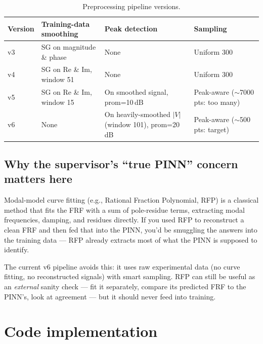 \documentclass[11pt,a4paper]{article}
\begin{document}
\begin{table}[h]
\centering
\small
\begin{tabularx}{\linewidth}{l X X X}
\toprule
\textbf{Version} & \textbf{Training-data smoothing} & \textbf{Peak detection} & \textbf{Sampling} \\
\midrule
v3 & SG on magnitude \& phase   & None & Uniform 300 \\
v4 & SG on Re \& Im, window 51  & None & Uniform 300 \\
v5 & SG on Re \& Im, window 15  & On smoothed signal, prom=10\,dB & Peak-aware ($\sim$7000 pts: too many) \\
v6 & None                        & On heavily-smoothed $|V|$ (window 101), prom=20\,dB & Peak-aware ($\sim$500 pts: target) \\
\bottomrule
\end{tabularx}
\caption{Preprocessing pipeline versions.}
\end{table}

\subsection{Why the supervisor's ``true PINN'' concern matters here}

Modal-model curve fitting (e.g., Rational Fraction Polynomial, RFP) is a classical method that fits the FRF with a sum of pole-residue terms, extracting modal frequencies, damping, and residues directly. If you used RFP to reconstruct a clean FRF and then fed that into the PINN, you'd be smuggling the answers into the training data --- RFP already extracts most of what the PINN is supposed to identify.

The current v6 pipeline avoids this: it uses raw experimental data (no curve fitting, no reconstructed signals) with smart sampling. RFP can still be useful as an \emph{external} sanity check --- fit it separately, compare its predicted FRF to the PINN's, look at agreement --- but it should never feed into training.

\section{Code implementation}
\label{sec:code}
\end{document}
